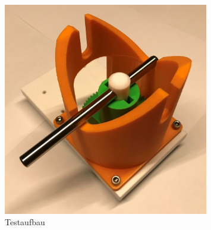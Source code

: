 \documentclass[../../main.tex]{subfiles}
\begin{document}
        \begin{figure}[H]
            \centering
            \includegraphics[width=0.8\textwidth]{../../images/Kran/Testaufbau.JPG}
            \caption {Testaufbau}
        \end{figure}
        \pagebreak
\end{document}
